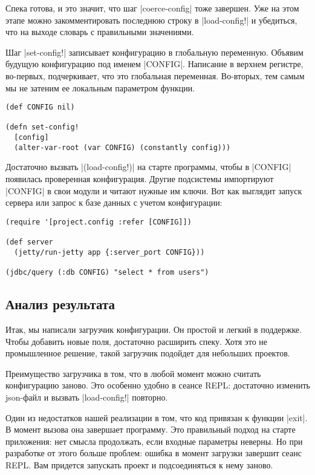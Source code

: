 Спека готова, и это значит, что шаг \spverb|coerce-config| тоже завершен. Уже на этом
этапе можно закомментировать последнюю строку в \spverb|load-config!| и убедиться, что
на выходе словарь с правильными значениями.

Шаг \spverb|set-config!| записывает конфигурацию в глобальную переменную. Объявим
будущую конфигурацию под именем \spverb|CONFIG|. Написание в верхнем регистре,
во-первых, подчеркивает, что это глобальная переменная. Во-вторых, тем самым мы
не затеним ее локальным параметром функции.

\begin{verbatim}
(def CONFIG nil)

(defn set-config!
  [config]
  (alter-var-root (var CONFIG) (constantly config)))
\end{verbatim}

Достаточно вызвать \spverb|(load-config!)| на старте программы, чтобы в \spverb|CONFIG|
появилась проверенная конфигурация. Другие подсистемы импортируют \spverb|CONFIG| в
свои модули и читают нужные им ключи. Вот как выглядит запуск сервера или запрос
к базе данных с учетом конфигурации:

\begin{verbatim}
(require '[project.config :refer [CONFIG]])

(def server
  (jetty/run-jetty app {:server_port CONFIG}))

(jdbc/query (:db CONFIG) "select * from users")
\end{verbatim}

\subsection{Анализ результата}

Итак, мы написали загрузчик конфигурации. Он простой и легкий в поддержке. Чтобы
добавить новые поля, достаточно расширить спеку. Хотя это не промышленное
решение, такой загрузчик подойдет для небольших проектов.

Преимущество загрузчика в том, что в любой момент можно считать конфигурацию
заново. Это особенно удобно в сеансе REPL: достаточно изменить json-файл и
вызвать \spverb|load-config!| повторно.

Один из недостатков нашей реализации в том, что код привязан к функции \spverb|exit|. В
момент вызова она завершает программу. Это правильный подход на старте
приложения: нет смысла продолжать, если входные параметры неверны. Но при
разработке от этого больше проблем: ошибка в момент загрузки завершит сеанс
REPL. Вам придется запускать проект и подсоединяться к нему заново.

